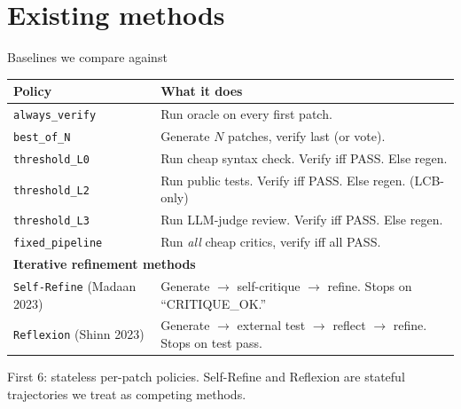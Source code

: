 \documentclass[10pt]{beamer}
\begin{document}

\section{Existing methods}
\hypertarget{out:2}{}

\begin{frame}{Baselines we compare against}
\vspace{0.2cm}
\begin{table}
\centering
\small
\begin{tabular}{p{4cm}p{6.5cm}}
\toprule
\textcolor{primaryBlue}{\textbf{Policy}} & \textcolor{primaryBlue}{\textbf{What it does}} \\
\midrule
\texttt{always\_verify} & Run oracle on every first patch. \\
\texttt{best\_of\_N} & Generate $N$ patches, verify last (or vote). \\
\texttt{threshold\_L0} & \textcolor{accentTeal}{Run cheap syntax check.} Verify iff PASS. Else regen. \\
\texttt{threshold\_L2} & \textcolor{accentTeal}{Run public tests.} Verify iff PASS. Else regen. (LCB-only) \\
\texttt{threshold\_L3} & \textcolor{accentTeal}{Run LLM-judge review.} Verify iff PASS. Else regen. \\
\texttt{fixed\_pipeline} & Run \emph{all} cheap critics, verify iff all PASS. \\
\midrule
\multicolumn{2}{l}{\textcolor{accentPurple}{\textbf{Iterative refinement methods}}} \\
\texttt{Self-Refine} \footnotesize{(Madaan 2023)} & Generate $\to$ self-critique $\to$ refine. Stops on ``CRITIQUE\_OK.'' \\
\texttt{Reflexion} \footnotesize{(Shinn 2023)} & Generate $\to$ external test $\to$ reflect $\to$ refine. Stops on test pass. \\
\bottomrule
\end{tabular}
\end{table}
\vspace{0.2cm}
First 6: \textcolor{accentTeal}{stateless per-patch policies}.
\textcolor{accentPurple}{Self-Refine and Reflexion} are stateful trajectories
we treat as competing methods.
\end{frame}
\end{document}
